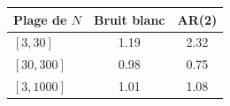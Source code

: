 \begin{tabular}{lcc}
\toprule
Plage de $N$ & Bruit blanc & AR(2) \\
\midrule
$[3,30]$ & 1.19 & 2.32 \\
$[30,300]$ & 0.98 & 0.75 \\
$[3,1000]$ & 1.01 & 1.08 \\
\bottomrule
\end{tabular}
